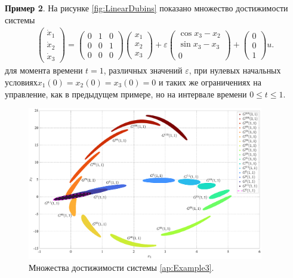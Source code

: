 \documentclass[../main.tex]{subfiles}
\begin{document}
   	 \textbf{Пример 2}. На рисунке \ref{fig:LinearDubins} показано множество достижимости системы 
   \begin{gather}\label{ap:Linear+Dubins}
   	\begin{pmatrix} 
   		\dot{x}_1 \\
   		\dot{x}_2 \\ 
   		\dot{x}_3 \end{pmatrix} = 
   	\begin{pmatrix}
   		0 & 1 & 0 \\
   		0 & 0 & 1 \\
   		0 & 0 & 0
   	\end{pmatrix}
   	\begin{pmatrix} 
   		x_1 \\
   		x_2 \\ 
   		x_3 \end{pmatrix} + 
   	\varepsilon
   	\begin{pmatrix}
   		\cos x_3 - x_2\\
   		\sin x_3 - x_3 \\
   		0
   	\end{pmatrix} + 
   	\begin{pmatrix}
   		0 \\ 0 \\ 1
   	\end{pmatrix} u.
   \end{gather}
   	для момента времени $t = 1$, различных значений $\varepsilon$, при нулевых начальных условиях$x_1(0) = x_2(0) = x_3(0) = 0 $ и таких же ограничениях на управление, как в предыдущем примере, но на интервале времени $0 \leqslant t \leqslant 1$.
   	
   	\begin{figure}[t]
   		\centering
   			\includegraphics[width=0.92\textwidth]{images/Osipov_QuaziLinearExp.eps}
   		\caption{Множества достижимости системы \eqref{ap:Example3}.}
   		\label{ap:fig:QuaziLinearExp}
   	\end{figure}
  
\end{document}

